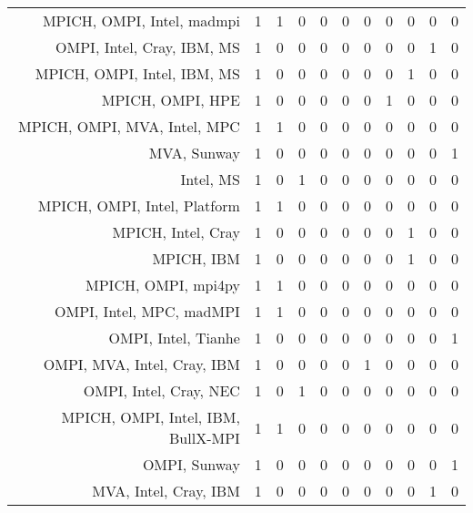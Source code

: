 {\begin{landscape}
\begin{longtable}[htb]{r|c|c|c|c|c|c|c|c|c|c}
{MPICH, OMPI, Intel, madmpi} & 1 & 1 & 0 & 0 & 0 & 0 & 0 & 0 & 0 & 0 \\%
{OMPI, Intel, Cray, IBM, MS} & 1 & 0 & 0 & 0 & 0 & 0 & 0 & 0 & 1 & 0 \\%
{MPICH, OMPI, Intel, IBM, MS} & 1 & 0 & 0 & 0 & 0 & 0 & 0 & 1 & 0 & 0 \\%
{MPICH, OMPI, HPE} & 1 & 0 & 0 & 0 & 0 & 0 & 1 & 0 & 0 & 0 \\%
{MPICH, OMPI, MVA, Intel, MPC} & 1 & 1 & 0 & 0 & 0 & 0 & 0 & 0 & 0 & 0 \\%
{MVA, Sunway} & 1 & 0 & 0 & 0 & 0 & 0 & 0 & 0 & 0 & 1 \\%
{Intel, MS} & 1 & 0 & 1 & 0 & 0 & 0 & 0 & 0 & 0 & 0 \\%
{MPICH, OMPI, Intel, Platform} & 1 & 1 & 0 & 0 & 0 & 0 & 0 & 0 & 0 & 0 \\%
{MPICH, Intel, Cray} & 1 & 0 & 0 & 0 & 0 & 0 & 0 & 1 & 0 & 0 \\%
{MPICH, IBM} & 1 & 0 & 0 & 0 & 0 & 0 & 0 & 1 & 0 & 0 \\%
{MPICH, OMPI, mpi4py} & 1 & 1 & 0 & 0 & 0 & 0 & 0 & 0 & 0 & 0 \\%
{OMPI, Intel, MPC, madMPI} & 1 & 1 & 0 & 0 & 0 & 0 & 0 & 0 & 0 & 0 \\%
{OMPI, Intel, Tianhe} & 1 & 0 & 0 & 0 & 0 & 0 & 0 & 0 & 0 & 1 \\%
{OMPI, MVA, Intel, Cray, IBM} & 1 & 0 & 0 & 0 & 0 & 1 & 0 & 0 & 0 & 0 \\%
{OMPI, Intel, Cray, NEC} & 1 & 0 & 1 & 0 & 0 & 0 & 0 & 0 & 0 & 0 \\%
{MPICH, OMPI, Intel, IBM, BullX-MPI} & 1 & 1 & 0 & 0 & 0 & 0 & 0 & 0 & 0 & 0 \\%
{OMPI, Sunway} & 1 & 0 & 0 & 0 & 0 & 0 & 0 & 0 & 0 & 1 \\%
{MVA, Intel, Cray, IBM} & 1 & 0 & 0 & 0 & 0 & 0 & 0 & 0 & 1 & 0 \\%
\hline%
\end{longtable}%
\end{landscape}}%
\clearpage%
